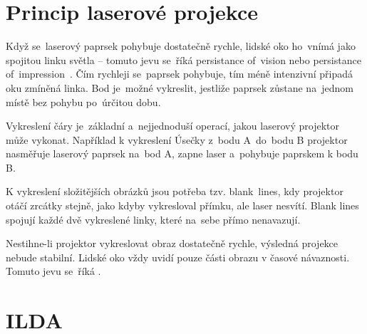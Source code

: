 
\section{Princip laserové projekce}\label{sec:projection-princip}
Když se~laserový paprsek pohybuje dostatečně rychle, lidské oko ho~vnímá jako spojitou linku světla -- tomuto jevu se~říká persistance of~vision nebo persistance of~impression~\cite{persistance-of-vision}.
Čím rychleji se~paprsek pohybuje, tím méně intenzivní připadá oku zmíněná linka. Bod je~možné vykreslit, jestliže paprsek zůstane na~jednom místě bez pohybu po~úrčitou dobu.

Vykreslení čáry je~základní a~nejjednoduší operací, jakou laserový projektor může vykonat. Například k vykreslení Úsečky z~bodu A~do~bodu B projektor nasměřuje laserový paprsek na~bod A, zapne laser a~pohybuje paprskem k bodu B.

K vykreslení složitějších obrázků jsou potřeba tzv. blank\ lines, kdy projektor otáčí zrcátky stejně, jako kdyby vykresloval přímku, ale laser nesvítí. Blank lines spojují každé dvě vykreslené linky, které na~sebe přímo nenavazují.

Nestihne-li projektor vykreslovat obraz dostatečně rychle, výsledná projekce nebude stabilní. Lidské oko vždy uvidí pouze části obrazu v časové návaznosti. Tomuto jevu se~říká .

\section{ILDA}
